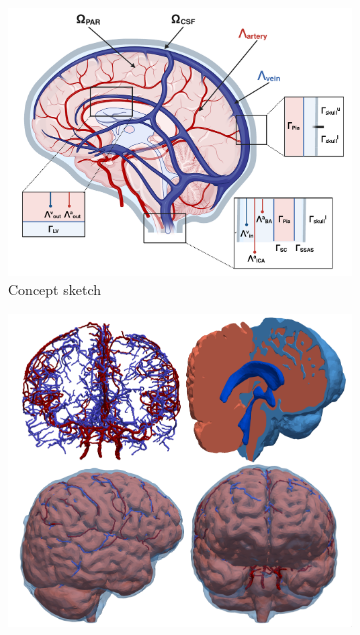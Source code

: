 \documentclass[fleqn,10pt]{wlscirep}
\begin{document}
\begin{figure}
     \centering
     \begin{subfigure}[b]{0.45\textwidth}
         \centering
         \includegraphics[width=\textwidth]{figures/Brain-PVS-callouts.pdf}
         \caption{Concept sketch}
         \label{fig:y equals x}
     \end{subfigure}
     \hfill
     \begin{subfigure}[b]{0.3\textwidth}
         \centering
         \includegraphics[width=\textwidth]{figures/geometry_concept.png}

\end{subfigure}
\end{figure}
\end{document}
